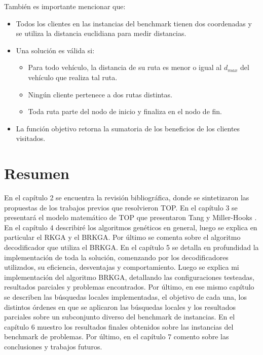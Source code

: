 \begin{minipage}{\textwidth}
También es importante mencionar que:

\begin{itemize}
	\item Todos los clientes en las instancias del benchmark tienen dos coordenadas y se utiliza la distancia euclidiana para medir distancias.
	\item Una solución es válida si:
	\begin{itemize}
		\item Para todo vehículo, la distancia de su ruta es menor o igual al $d_{max}$ del vehículo que realiza tal ruta.
		\item Ningún cliente pertenece a dos rutas distintas.
		\item Toda ruta parte del nodo de inicio y finaliza en el nodo de fin.
	\end{itemize}
	\item La función objetivo retorna la sumatoria de los beneficios de los clientes visitados.
\end{itemize}
\end{minipage}

\bigskip

\section{Resumen}

En el capítulo 2 se encuentra la revisión bibliográfica, donde se sintetizaron las propuestas de los trabajos previos que resolvieron TOP.
En el capítulo 3 se presentará el modelo matemático de TOP que presentaron Tang y Miller-Hooks \cite{TangMillerHooks} .
En el capítulo 4 describiré los algoritmos genéticos en general, luego se explica en particular el RKGA y el BRKGA. Por último se comenta sobre el algoritmo decodificador que utiliza el BRKGA.
En el capítulo 5 se detalla en profundidad la implementación de toda la solución, comenzando por los decodificadores utilizados, su eficiencia, desventajas y comportamiento. Luego se explica mi implementación del algoritmo BRKGA, detallando las configuraciones testeadas, resultados parciales y problemas encontrados. Por último, en ese mismo capítulo se describen las búsquedas locales implementadas, el objetivo de cada una, los distintos órdenes en que se aplicaron las búsquedas locales y los resultados parciales sobre un subconjunto diverso del benchmark de instancias.
En el capítulo 6 muestro los resultados finales obtenidos sobre las instancias del benchmark de problemas.
Por último, en el capítulo 7 comento sobre las conclusiones y trabajos futuros.


























